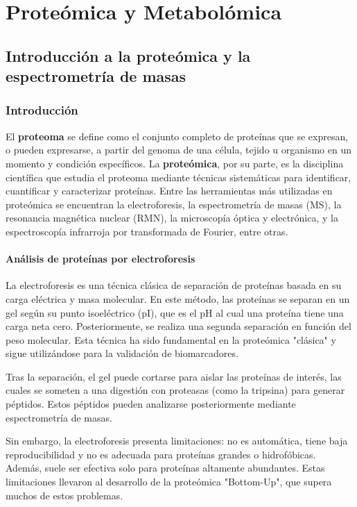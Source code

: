 \part{Proteómica y Metabolómica}
\chapter{Introducción a la proteómica y la espectrometría de masas}
\section{Introducción}
El \textbf{proteoma} se define como el conjunto completo de proteínas que se expresan, o pueden expresarse, a partir del genoma de una célula, tejido u organismo en un momento y condición específicos. La \textbf{proteómica}, por su parte, es la disciplina científica que estudia el proteoma mediante técnicas sistemáticas para identificar, cuantificar y caracterizar proteínas. Entre las herramientas más utilizadas en proteómica se encuentran la electroforesis, la espectrometría de masas (MS), la resonancia magnética nuclear (RMN), la microscopía óptica y electrónica, y la espectroscopía infrarroja por transformada de Fourier, entre otras.

\subsection{Análisis de proteínas por electroforesis}
La electroforesis es una técnica clásica de separación de proteínas basada en su carga eléctrica y masa molecular. En este método, las proteínas se separan en un gel según su punto isoeléctrico (pI), que es el pH al cual una proteína tiene una carga neta cero. Posteriormente, se realiza una segunda separación en función del peso molecular. Esta técnica ha sido fundamental en la proteómica "clásica" y sigue utilizándose para la validación de biomarcadores.

Tras la separación, el gel puede cortarse para aislar las proteínas de interés, las cuales se someten a una digestión con proteasas (como la tripsina) para generar péptidos. Estos péptidos pueden analizarse posteriormente mediante espectrometría de masas.

Sin embargo, la electroforesis presenta limitaciones: no es automática, tiene baja reproducibilidad y no es adecuada para proteínas grandes o hidrofóbicas. Además, suele ser efectiva solo para proteínas altamente abundantes. Estas limitaciones llevaron al desarrollo de la proteómica "Bottom-Up", que supera muchos de estos problemas.

